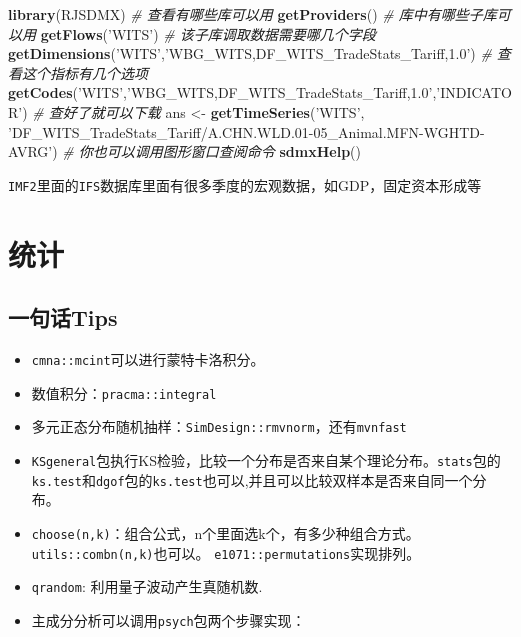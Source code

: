 \documentclass[
]{book}
\newenvironment{Shaded}{\begin{snugshade}}{\end{snugshade}}
\newcommand{\CommentTok}[1]{\textcolor[rgb]{0.56,0.35,0.01}{\textit{#1}}}
\newcommand{\KeywordTok}[1]{\textcolor[rgb]{0.13,0.29,0.53}{\textbf{#1}}}
\newcommand{\NormalTok}[1]{#1}
\newcommand{\StringTok}[1]{\textcolor[rgb]{0.31,0.60,0.02}{#1}}
\providecommand{\tightlist}{%
  \setlength{\itemsep}{0pt}\setlength{\parskip}{0pt}}
\begin{document}
\begin{Shaded}
\begin{Highlighting}[]
\KeywordTok{library}\NormalTok{(RJSDMX)}
\CommentTok{# 查看有哪些库可以用}
\KeywordTok{getProviders}\NormalTok{()}
\CommentTok{# 库中有哪些子库可以用}
\KeywordTok{getFlows}\NormalTok{(}\StringTok{'WITS'}\NormalTok{)}
\CommentTok{# 该子库调取数据需要哪几个字段}
\KeywordTok{getDimensions}\NormalTok{(}\StringTok{'WITS'}\NormalTok{,}\StringTok{'WBG_WITS,DF_WITS_TradeStats_Tariff,1.0'}\NormalTok{)}
\CommentTok{# 查看这个指标有几个选项 }
\KeywordTok{getCodes}\NormalTok{(}\StringTok{'WITS'}\NormalTok{,}\StringTok{'WBG_WITS,DF_WITS_TradeStats_Tariff,1.0'}\NormalTok{,}\StringTok{'INDICATOR'}\NormalTok{)}
\CommentTok{# 查好了就可以下载}
\NormalTok{ans <-}\StringTok{ }\KeywordTok{getTimeSeries}\NormalTok{(}\StringTok{'WITS'}\NormalTok{, }\StringTok{'DF_WITS_TradeStats_Tariff/A.CHN.WLD.01-05_Animal.MFN-WGHTD-AVRG'}\NormalTok{)}
\CommentTok{# 你也可以调用图形窗口查阅命令}
\KeywordTok{sdmxHelp}\NormalTok{()}
\end{Highlighting}
\end{Shaded}

\texttt{IMF2}里面的\texttt{IFS}数据库里面有很多季度的宏观数据，如GDP，固定资本形成等

\hypertarget{ux7edfux8ba1}{%
\chapter{统计}\label{ux7edfux8ba1}}

\hypertarget{ux4e00ux53e5ux8bddtips-3}{%
\section{一句话Tips}\label{ux4e00ux53e5ux8bddtips-3}}

\begin{itemize}
\tightlist
\item
  \texttt{cmna::mcint}可以进行蒙特卡洛积分。
\item
  数值积分：\texttt{pracma::integral}
\item
  多元正态分布随机抽样：\texttt{SimDesign::rmvnorm}，还有\texttt{mvnfast}
\item
  \texttt{KSgeneral}包执行KS检验，比较一个分布是否来自某个理论分布。\texttt{stats}包的\texttt{ks.test}和\texttt{dgof}包的\texttt{ks.test}也可以,并且可以比较双样本是否来自同一个分布。
\item
  \texttt{choose(n,k)}：组合公式，n个里面选k个，有多少种组合方式。\texttt{utils::combn(n,k)}也可以。 \texttt{e1071::permutations}实现排列。
\item
  \texttt{qrandom}: 利用量子波动产生真随机数.
\item
  主成分分析可以调用\texttt{psych}包两个步骤实现：
\end{itemize}
\end{document}
